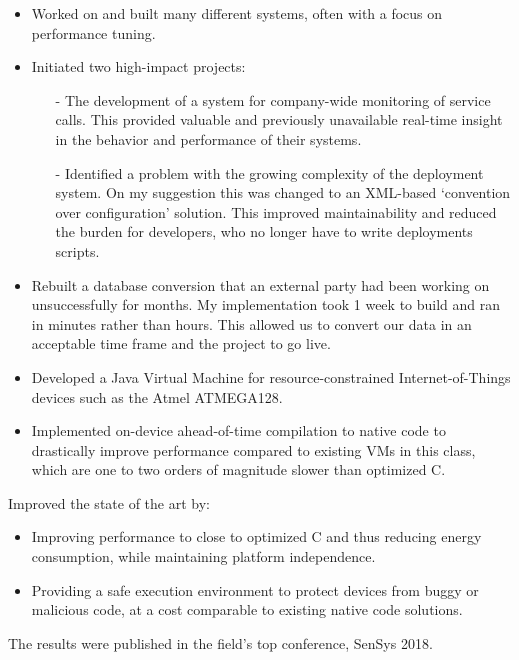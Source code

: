 \documentclass[10pt,a4paper]{../altacv}
\begin{document}
\medskip

\begin{itemize}
	\item Worked on and built many different systems, often with a focus on performance tuning.
	\item Initiated two high-impact projects:
	\begin{itemize}
		\item[-] The development of a system for company-wide monitoring of service calls. This provided valuable and previously unavailable real-time insight in the behavior and performance of their systems.
		\item[-] Identified a problem with the growing complexity of the deployment system. On my suggestion this was changed to an XML-based ‘convention over configuration' solution. This improved maintainability and reduced the burden for developers, who no longer have to write deployments scripts.
	\end{itemize}
	\item Rebuilt a database conversion that an external party had been working on unsuccessfully for months. My implementation took 1 week to build and ran in minutes rather than hours. This allowed us to convert our data in an acceptable time frame and the project to go live.
\end{itemize}

\medskip\medskip{}

\begin{itemize}
	\item Developed a Java Virtual Machine for resource-constrained Internet-of-Things devices such as the Atmel ATMEGA128.
	\item Implemented on-device ahead-of-time compilation to native code to drastically improve performance compared to existing VMs in this class, which are one to two orders of magnitude slower than optimized C.
\end{itemize}

Improved the state of the art by:

\medskip

\begin{itemize}
	\item Improving performance to close to optimized C and thus reducing energy consumption, while maintaining platform independence.
	\item Providing a safe execution environment to protect devices from buggy or malicious code, at a cost comparable to existing native code solutions.
\end{itemize}

\medskip

The results were published in the field's top conference, SenSys 2018.

\medskip


\medskip
\end{document}
